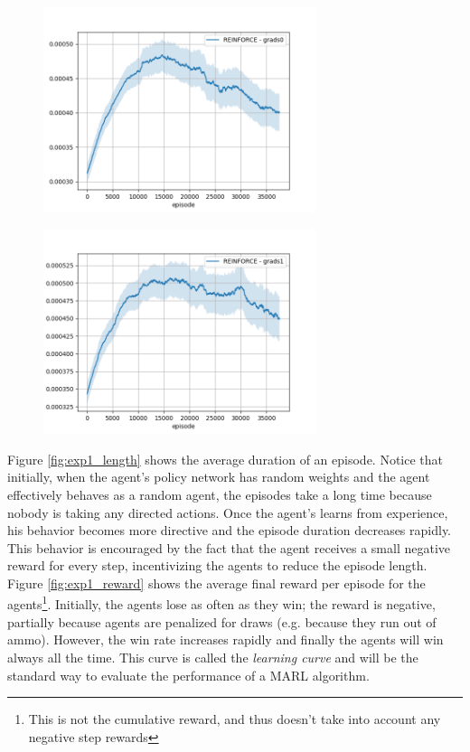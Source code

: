 \begin{figure}
\centering
\begin{minipage}{.5\textwidth}
  \centering
  \includegraphics[width=8cm]{images/experiment4/grad0.png}
  \label{fig:exp1_grad0}
\end{minipage}%
\begin{minipage}{.5\textwidth}
  \centering
  \includegraphics[width=8cm]{images/experiment4/grad1.png}
  \label{fig:exp1_grad1}
\end{minipage}
\end{figure}

Figure \ref{fig:exp1_length} shows the average duration of an episode. Notice that initially, when the agent's policy network has random weights and the agent effectively behaves as a random agent, the episodes take a long time because nobody is taking any directed actions. Once the agent's learns from experience, his behavior becomes more directive and the episode duration decreases rapidly. This behavior is encouraged by the fact that the agent receives a small negative reward for every step, incentivizing the agents to reduce the episode length. Figure \ref{fig:exp1_reward} shows the average final reward per episode for the agents\footnote{This is not the cumulative reward, and thus doesn't take into account any negative step rewards}. Initially, the agents lose as often as they win; the reward is negative, partially because agents are penalized for draws (e.g. because they run out of ammo). However, the win rate increases rapidly and finally the agents will win always all the time. This curve is called the \emph{learning curve} and will be the standard way to evaluate the performance of a MARL algorithm.\\

